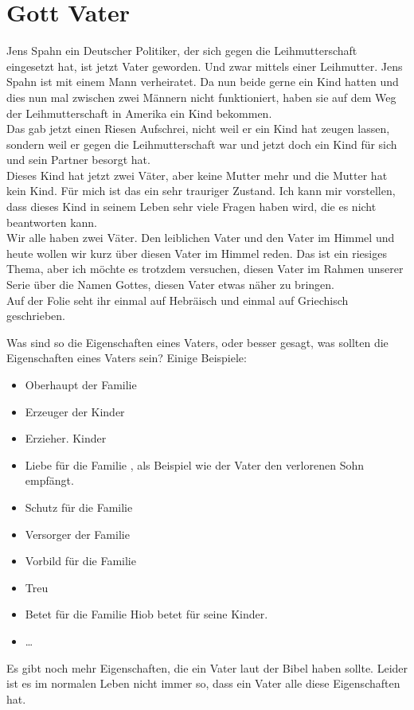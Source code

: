 \section{Gott Vater}
\begin{otsblock}[Einführung]
    Jens Spahn ein Deutscher Politiker, der sich gegen die Leihmutterschaft eingesetzt hat, ist jetzt Vater geworden. Und zwar mittels einer Leihmutter. Jens Spahn ist mit einem Mann verheiratet. Da nun beide gerne ein Kind hatten und dies nun mal zwischen zwei Männern nicht funktioniert, haben sie auf dem Weg der Leihmutterschaft in Amerika ein Kind bekommen.\\
    Das gab jetzt einen Riesen Aufschrei, nicht weil er ein Kind hat zeugen lassen, sondern weil er gegen die Leihmutterschaft war und jetzt doch ein Kind für sich und sein Partner besorgt hat.\\
    Dieses Kind hat jetzt zwei Väter, aber keine Mutter mehr und die Mutter hat kein Kind. Für mich ist das ein sehr trauriger Zustand. Ich kann mir vorstellen, dass dieses Kind in seinem Leben sehr viele Fragen haben wird, die es nicht beantworten kann.\\

    Wir alle haben zwei Väter. Den leiblichen Vater und den Vater im Himmel und heute wollen wir kurz über diesen Vater im Himmel reden. Das ist ein riesiges Thema, aber ich möchte es trotzdem versuchen, diesen Vater im Rahmen unserer Serie über die Namen Gottes, diesen Vater etwas näher zu bringen.\\

    Auf der Folie seht ihr einmal  auf Hebräisch und einmal auf Griechisch geschrieben.

    Was sind so die Eigenschaften eines Vaters, oder besser gesagt, was sollten die Eigenschaften eines Vaters sein? Einige Beispiele:
    \begin{itemize}
        \item Oberhaupt der Familie 
        \item Erzeuger der Kinder 
        \item Erzieher. Kinder 
        \item Liebe für die Familie , als Beispiel wie der Vater den verlorenen Sohn empfängt.
        \item Schutz für die Familie
        \item Versorger der Familie 
        \item Vorbild für die Familie
        \item Treu
        \item Betet für die Familie  Hiob betet für seine Kinder.
        \item \dots
    \end{itemize}
    Es gibt noch mehr Eigenschaften, die ein Vater laut der Bibel haben sollte. Leider ist es im normalen Leben nicht immer so, dass ein Vater alle diese Eigenschaften hat.


\end{otsblock}
